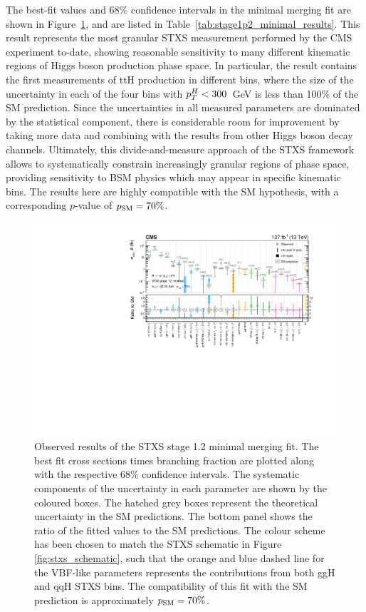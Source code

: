 The \xsbr best-fit values and 68\% confidence intervals in the minimal merging fit are shown in Figure~\ref{fig:stage1p2_minimal_results}, and are listed in Table~\ref{tab:stage1p2_minimal_results}. This result represents the most granular STXS measurement performed by the CMS experiment to-date, showing reasonable sensitivity to many different kinematic regions of Higgs boson production phase space. In particular, the result contains the first measurements of ttH production in different bins, where the size of the uncertainty in each of the four bins with $p_T^H<300$~GeV is less than 100\% of the SM prediction. Since the uncertainties in all measured parameters are dominated by the statistical component, there is considerable room for improvement by taking more data and combining with the results from other Higgs boson decay channels. Ultimately, this divide-and-measure approach of the STXS framework allows to systematically constrain increasingly granular regions of phase space, providing sensitivity to BSM physics which may appear in specific kinematic bins. The results here are highly compatible with the SM hypothesis, with a corresponding $p$-value of $p_{\rm{SM}}=70\%$.

\begin{figure}[htb!]
  \centering
  \hspace*{-1.3cm}
  \includegraphics[width=1.2\textwidth]{Figures/hgg_results/stage1p2_minimal_summary.pdf}
  \hspace*{-1.3cm}
  \caption[Results of the STXS stage 1.2 minimal merging fit]
  {
    Observed results of the STXS stage 1.2 minimal merging fit. The best fit cross sections times branching fraction are plotted along with the respective 68\% confidence intervals. The systematic components of the uncertainty in each parameter are shown by the coloured boxes. The hatched grey boxes represent the theoretical uncertainty in the SM predictions. The bottom panel shows the ratio of the fitted values to the SM predictions. The colour scheme has been chosen to match the STXS schematic in Figure \ref{fig:stxs_schematic}, such that the orange and blue dashed line for the VBF-like parameters represents the contributions from both ggH and qqH STXS bins. The compatibility of this fit with the SM prediction is approximately $p_{\rm{SM}}=70\%$. 
  }
  \label{fig:stage1p2_minimal_results}
\end{figure}

